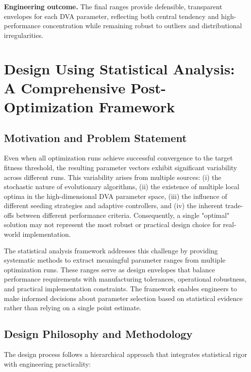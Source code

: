 \documentclass[12pt,a4paper]{article}
\begin{document}
\vspace{0.5em}
\noindent\textbf{Engineering outcome.} The final ranges provide defensible, transparent envelopes for each DVA parameter, reflecting both central tendency and high-performance concentration while remaining robust to outliers and distributional irregularities.


\section{Design Using Statistical Analysis: A Comprehensive Post-Optimization Framework}
\label{sec:design-statistical-analysis}

\subsection{Motivation and Problem Statement}

Even when all optimization runs achieve successful convergence to the target fitness threshold, the resulting parameter vectors exhibit significant variability across different runs. This variability arises from multiple sources: (i) the stochastic nature of evolutionary algorithms, (ii) the existence of multiple local optima in the high-dimensional DVA parameter space, (iii) the influence of different seeding strategies and adaptive controllers, and (iv) the inherent trade-offs between different performance criteria. Consequently, a single "optimal" solution may not represent the most robust or practical design choice for real-world implementation.

The statistical analysis framework addresses this challenge by providing systematic methods to extract meaningful parameter ranges from multiple optimization runs. These ranges serve as design envelopes that balance performance requirements with manufacturing tolerances, operational robustness, and practical implementation constraints. The framework enables engineers to make informed decisions about parameter selection based on statistical evidence rather than relying on a single point estimate.

\subsection{Design Philosophy and Methodology}

The design process follows a hierarchical approach that integrates statistical rigor with engineering practicality:
\end{document}
